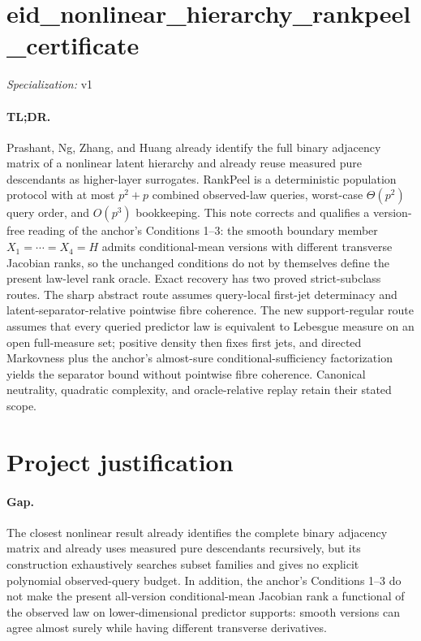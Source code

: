 \documentclass{article}
\begin{document}
\sloppy

\section*{eid\_\allowbreak{}nonlinear\_\allowbreak{}hierarchy\_\allowbreak{}rankpeel\_\allowbreak{}certificate}

\noindent\textit{Specialization:} v1\par

\paragraph{TL;DR.} Prashant, Ng, Zhang, and Huang already identify the full binary adjacency matrix of a nonlinear latent hierarchy and already reuse measured pure descendants as higher-layer surrogates.  RankPeel is a deterministic population protocol with at most \(p^2+p\) combined observed-law queries, worst-case \(\Theta(p^2)\) query order, and \(O(p^3)\) bookkeeping.  This note corrects and qualifies a version-free reading of the anchor's Conditions 1--3: the smooth boundary member \(X_1=\cdots=X_4=H\) admits conditional-mean versions with different transverse Jacobian ranks, so the unchanged conditions do not by themselves define the present law-level rank oracle.  Exact recovery has two proved strict-subclass routes.  The sharp abstract route assumes query-local first-jet determinacy and latent-separator-relative pointwise fibre coherence.  The new support-regular route assumes that every queried predictor law is equivalent to Lebesgue measure on an open full-measure set; positive density then fixes first jets, and directed Markovness plus the anchor's almost-sure conditional-sufficiency factorization yields the separator bound without pointwise fibre coherence.  Canonical neutrality, quadratic complexity, and oracle-relative replay retain their stated scope.

\section{Project justification}

\paragraph{Gap.} The closest nonlinear result already identifies the complete binary adjacency matrix and already uses measured pure descendants recursively, but its construction exhaustively searches subset families and gives no explicit polynomial observed-query budget.  In addition, the anchor's Conditions 1--3 do not make the present all-version conditional-mean Jacobian rank a functional of the observed law on lower-dimensional predictor supports: smooth versions can agree almost surely while having different transverse derivatives.
\end{document}
